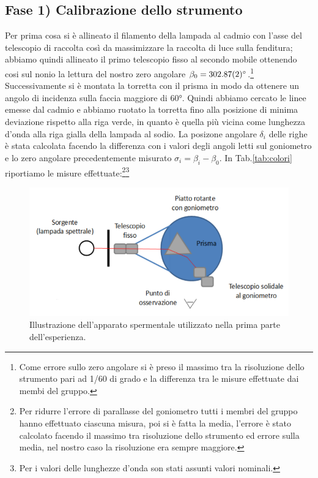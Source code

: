 \documentclass[10pt,a4paper]{article}
\begin{document}
\subsection*{Fase 1) Calibrazione dello strumento}
    Per prima cosa si è allineato il filamento della lampada al cadmio con l’asse del telescopio di raccolta così da massimizzare la  raccolta di luce sulla fenditura; abbiamo quindi allineato il primo telescopio fisso al secondo mobile ottenendo cosi sul nonio la lettura del nostro zero angolare $\beta_{0} = \ang{302.87 \pm 0.02}$.\footnote{Come errore sullo zero angolare si è preso il massimo tra la risoluzione dello strumento pari ad 1/60 di grado e la differenza tra le misure effettuate dai membi del gruppo.} Successivamente si è montata la torretta con il prisma in modo da ottenere un angolo di incidenza sulla faccia maggiore di \ang{60}. Quindi abbiamo cercato le linee emesse dal cadmio e abbiamo ruotato la torretta fino alla posizione di minima deviazione rispetto alla riga verde, in quanto è quella più vicina come lunghezza d'onda alla riga gialla della lampada al sodio.\newline\newline
    La posizone angolare $\delta_i$ delle righe è stata calcolata facendo la differenza con i valori degli angoli letti sul goniometro e lo zero angolare precedentemente misurato $\sigma_i = \beta_i - \beta_0$.\newline
    In Tab.\ref{tab:colori} riportiamo le misure effettuate:\footnote{ Per ridurre l'errore di parallasse del goniometro tutti i membri del gruppo hanno effettuato ciascuna misura, poi si è fatta la media, l'errore è stato calcolato facendo il massimo tra risoluzione dello strumento ed errore sulla media, nel nostro caso la risoluzione era sempre maggiore.}\footnote{Per i valori delle lunghezze d'onda son stati assunti valori nominali.}\newline\newline
    \begin{figure}[h]
        \centering
        \includegraphics[scale = 0.5]{spettroscopio_prisma.png}
        \caption{Illustrazione dell'apparato spermentale utilizzato nella prima parte dell'esperienza.}
        \label{fig:prisma}
    \end{figure}
\end{document}
